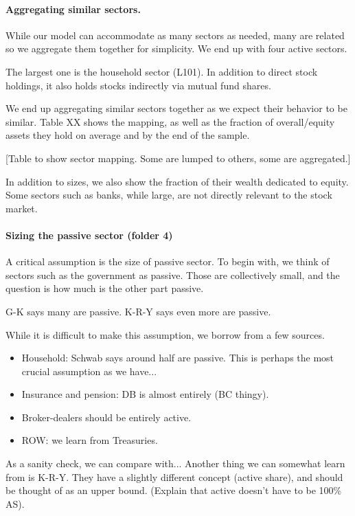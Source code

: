 \documentclass[pdftex,12pt,a4paper]{article}
\begin{document}
\paragraph{Aggregating similar sectors.} 
While our model can accommodate as many sectors as needed, many are related so we aggregate them together for simplicity. We end up with four active sectors. 

The largest one is the household sector (L101). In addition to direct stock holdings, it also holds stocks indirectly via mutual fund shares. 



We end up aggregating similar sectors together as we expect their behavior to be similar. Table XX shows the mapping, as well as the fraction of overall/equity assets they hold on average and by the end of the sample. 

[Table to show sector mapping. Some are lumped to others, some are aggregated.]

In addition to sizes, we also show the fraction of their wealth dedicated to equity. Some sectors such as banks, while large, are not directly relevant to the stock market. 

\paragraph{Sizing the passive sector (folder 4)}
A critical assumption is the size of passive sector. To begin with, we think of sectors such as the government as passive. Those are collectively small, and the question is how much is the other part passive. 

G-K says many are passive. K-R-Y says even more are passive. 

While it is difficult to make this assumption, we borrow from a few sources. \begin{itemize}
	\item Household: Schwab says around half are passive. This is perhaps the most crucial assumption as we have...
	\item Insurance and pension: DB is almost entirely (BC thingy). 
	\item Broker-dealers should be entirely active. 
	\item ROW: we learn from Treasuries. 
\end{itemize}

As a sanity check, we can compare with... 
Another thing we can somewhat learn from is K-R-Y. They have a slightly different concept (active share), and should be thought of as an upper bound. (Explain that active doesn't have to be 100\% AS). 
\end{document}
